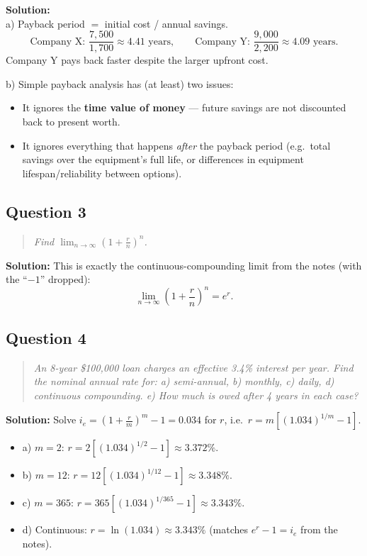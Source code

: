 \documentclass[11pt,letterpaper]{article}
\begin{document}
\textbf{Solution:}
\\ a) Payback period $=$ initial cost / annual savings.
\[\text{Company X: } \frac{7{,}500}{1{,}700} \approx 4.41 \text{ years}, \qquad \text{Company Y: } \frac{9{,}000}{2{,}200} \approx 4.09 \text{ years}.\]
Company Y pays back faster despite the larger upfront cost.

b) Simple payback analysis has (at least) two issues:
\begin{itemize}
    \item It ignores the \textbf{time value of money} --- future
    savings are not discounted back to present worth.
    \item It ignores everything that happens \emph{after} the payback
    period (e.g.\ total savings over the equipment's full life, or
    differences in equipment lifespan/reliability between options).
\end{itemize}

\subsection{Question 3}
\begin{quote}
    \itshape
    Find $\displaystyle\lim_{n\to\infty}\left(1+\frac{r}{n}\right)^n$.
\end{quote}

\textbf{Solution:} This is exactly the continuous-compounding limit
from the notes (with the ``$-1$'' dropped):
\[\lim_{n\to\infty}\left(1+\frac{r}{n}\right)^n = e^r.\]

\subsection{Question 4}
\begin{quote}
    \itshape
    An 8-year \$100,000 loan charges an effective 3.4\% interest per
    year. Find the nominal annual rate for: a) semi-annual, b) monthly,
    c) daily, d) continuous compounding. e) How much is owed after 4
    years in each case?
\end{quote}

\textbf{Solution:} Solve $i_e = \left(1+\frac{r}{m}\right)^m - 1 = 0.034$
for $r$, i.e.\ $r = m\left[(1.034)^{1/m}-1\right]$.
\begin{itemize}
    \item a) $m=2$: $r = 2\left[(1.034)^{1/2}-1\right] \approx 3.372\%$.
    \item b) $m=12$: $r = 12\left[(1.034)^{1/12}-1\right] \approx 3.348\%$.
    \item c) $m=365$: $r = 365\left[(1.034)^{1/365}-1\right] \approx 3.343\%$.
    \item d) Continuous: $r = \ln(1.034) \approx 3.343\%$ (matches
    $e^r - 1 = i_e$ from the notes).
\end{itemize}
\end{document}
